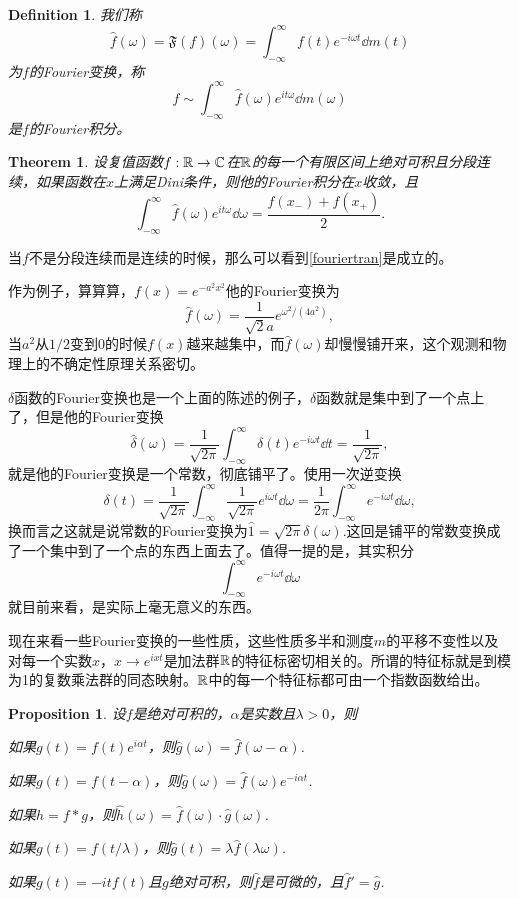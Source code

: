 \documentclass[10pt]{book}
\theoremstyle{plain}%
\newtheorem{pro}{Proposition}[chapter]%
\newtheorem{defi}{Definition}[chapter]%
\newtheorem{theo}{Theorem}[chapter]%
\newcommand{\cc}{\mathbb{C}}
\begin{document}
\begin{defi}
我们称
\[
\hat{f}(\omega)=\mathfrak{F}(f)(\omega)=\int_{-\infty}^\infty f(t)e^{-i\omega t}\dd m(t)
\]
为$f$的Fourier变换，称
\[
	f\sim \int_{-\infty}^\infty \hat{f}(\omega)e^{it\omega}\dd m(\omega)
\]
是$f$的Fourier积分。
\end{defi}
\begin{theo}
设复值函数$f:\rr\to\cc$在$\mathbb{R}$的每一个有限区间上绝对可积且分段连续，如果函数在$x$上满足Dini条件，则他的Fourier积分在$x$收敛，且
\[
	\int_{-\infty}^\infty \hat{f}(\omega)e^{it\omega}\dd\omega=\frac{f(x_-)+f(x_+)}{2}.
\]
\end{theo}
当$f$不是分段连续而是连续的时候，那么可以看到\eqref{fouriertran}是成立的。

作为例子，算算算，$f(x)=e^{-a^2x^2}$他的Fourier变换为
\[
	\hat{f}(\omega)=\frac{1}{\sqrt{2}a}e^{\omega^2/(4a^2)},
\]
当$a^2$从$1/2$变到$0$的时候$f(x)$越来越集中，而$\hat{f}(\omega)$却慢慢铺开来，这个观测和物理上的不确定性原理关系密切。

$\delta$函数的Fourier变换也是一个上面的陈述的例子，$\delta$函数就是集中到了一个点上了，但是他的Fourier变换
\[
	\hat{\delta}(\omega)=\frac{1}{\sqrt{2\pi}}\int_{-\infty}^\infty \delta(t)e^{-i\omega t}\dd t=\frac{1}{\sqrt{2\pi}},
\]
就是他的Fourier变换是一个常数，彻底铺平了。使用一次逆变换
\[
	\delta(t)=\frac{1}{\sqrt{2\pi}}\int_{-\infty}^\infty \frac{1}{\sqrt{2\pi}}e^{i\omega t}\dd \omega=\frac{1}{2\pi}\int_{-\infty}^\infty e^{-i\omega t}\dd \omega,
\]
换而言之这就是说常数的Fourier变换为$\hat{1}=\sqrt{2\pi}\delta(\omega)$.这回是铺平的常数变换成了一个集中到了一个点的东西上面去了。值得一提的是，其实积分
\[
	\int_{-\infty}^\infty e^{-i\omega t}\dd \omega
\]
就目前来看，是实际上毫无意义的东西。

现在来看一些Fourier变换的一些性质，这些性质多半和测度$m$的平移不变性以及对每一个实数$x$，$x\to e^{ixt}$是加法群$\mathbb{R}$的特征标密切相关的。所谓的特征标就是到模为1的复数乘法群的同态映射。$\mathbb{R}$中的每一个特征标都可由一个指数函数给出。

\begin{pro}
设$f$是绝对可积的，$\alpha$是实数且$\lambda>0$，则

 如果$g(t)=f(t)e^{i\alpha t}$，则$\hat{g}(\omega)=\hat{f}(\omega-\alpha)$.

 如果$g(t)=f(t-\alpha)$，则$\hat{g}(\omega)=\hat{f}(\omega)e^{-i\alpha t}$.

 如果$h=f*g$，则$\hat{h}(\omega)=\hat{f}(\omega)\cdot\hat{g}(\omega)$.

 如果$g(t)=f(t/\lambda)$，则$\hat{g}(t)=\lambda\hat{f}(\lambda \omega)$.

 如果$g(t)=-itf(t)$且$g$绝对可积，则$\hat{f}$是可微的，且$\hat{f}'=\hat{g}$.
\end{pro}
\end{document}
